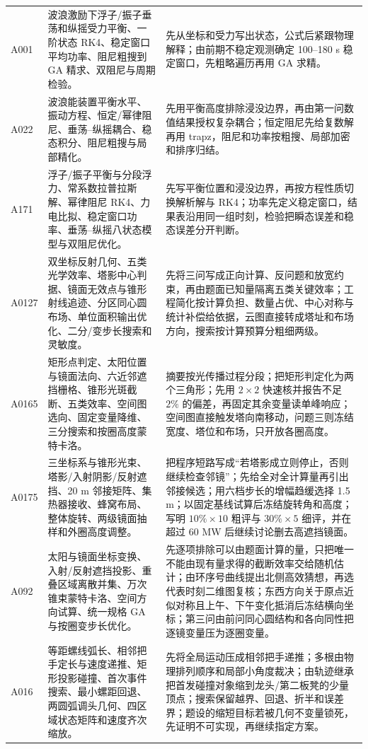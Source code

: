 \begin{longtable}{p{1.4cm}p{5.2cm}p{7.0cm}}
A001 & 波浪激励下浮子/振子垂荡和纵摇受力平衡、一阶状态 RK4、稳定窗口平均功率、阻尼粗搜到 GA 精求、双阻尼与周期检验。 &
先从坐标和受力写出状态，公式后紧跟物理解释；由前期不稳定观测确定 100--180 s 稳定窗口，先粗略遍历再用 GA 求精。\\
A022 & 波浪能装置平衡水平、振动方程、恒定/幂律阻尼、垂荡--纵摇耦合、稳态积分、阻尼粗搜与局部精化。 &
先用平衡高度排除浸没边界，再由第一问数值结果授权复杂耦合；恒定阻尼先给复数解再用 trapz，阻尼和功率按粗搜、局部加密和排序归结。\\
A171 & 浮子/振子平衡与分段浮力、常系数拉普拉斯解、幂律阻尼 RK4、力电比拟、稳定窗口功率、垂荡--纵摇八状态模型与双阻尼优化。 &
先写平衡位置和浸没边界，再按方程性质切换解析解与 RK4；功率先定义稳定窗口，结果表沿用同一组时刻，检验把瞬态误差和稳态误差分开判断。\\
A0127 & 双坐标反射几何、五类光学效率、塔影中心判据、镜面无效点与锥形射线追迹、分区同心圆布场、单位面积输出优化、二分/变步长搜索和灵敏度。 &
先将三问写成正向计算、反问题和放宽约束，再由题面已知量隔离五类关键效率；工程简化按计算负担、数量占优、中心对称与统计补偿给依据，云图直接转成塔址和布场方向，搜索按计算预算分粗细两级。\\
A0165 & 矩形点判定、太阳位置与镜面法向、六近邻遮挡栅格、锥形光斑截断、五类效率、空间图选向、固定变量降维、三分搜索和按圈高度蒙特卡洛。 &
摘要按光传播过程分段；把矩形判定化为两个三角形；先用 $2\times2$ 快速核并报告不足 $2\%$ 的偏差，再固定其余变量读单峰响应；空间图直接触发塔向南移动，问题三则冻结宽度、塔位和布场，只开放各圈高度。\\
A0175 & 三坐标系与锥形光束、塔影/入射阴影/反射遮挡、20 m 邻接矩阵、集热器接收、蜂窝布局、整体旋转、两级镜面抽样和外圈高度调整。 &
把程序短路写成“若塔影成立则停止，否则继续检查邻镜”；先给全对全计算量再引出邻接候选；用六档步长的增幅趋缓选择 1.5 m；以固定基线试算后冻结旋转角和高度；写明 $10\%\times10$ 粗评与 $30\%\times5$ 细评，并在超过 60 MW 后继续讨论删去高遮挡镜面。\\
A092 & 太阳与镜面坐标变换、入射/反射遮挡投影、重叠区域离散并集、万次锥束蒙特卡洛、空间方向试算、统一规格 GA 与按圈变步长优化。 &
先逐项排除可以由题面计算的量，只把唯一不能由现有量求得的截断效率交给随机估计；由环序号曲线提出北侧高效猜想，再选代表时刻二维图复核；东西方向关于原点近似对称且上午、下午变化抵消后冻结横向坐标；第三问由前问同心圆结构和各向同性把逐镜变量压为逐圈变量。\\
A016 & 等距螺线弧长、相邻把手定长与速度递推、矩形投影碰撞、首次事件搜索、最小螺距回退、两圆弧调头几何、四区域状态矩阵和速度齐次缩放。 &
先将全局运动压成相邻把手递推；多根由物理排列顺序和局部小角度裁决；由轨迹继承把首发碰撞对象缩到龙头/第二板凳的少量顶点；搜索保留越界、回退、折半和误差界；题设的缩短目标若被几何不变量锁死，先证明不可实现，再继续指定方案。\\

\end{longtable}

